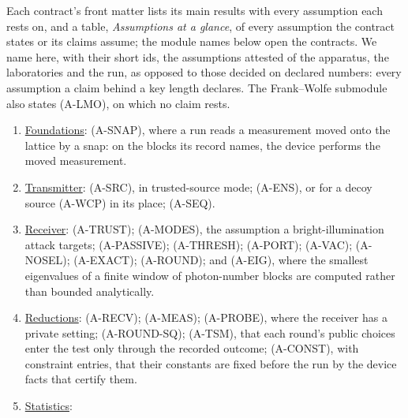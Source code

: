 Each contract's front matter lists its main results with every assumption
each rests on, and a table, \emph{Assumptions at a glance}, of every
assumption the contract states or its claims assume; the module names below
open the contracts. We name here, with their short ids, the assumptions
attested of the apparatus, the laboratories and the run, as opposed to those
decided on declared numbers: every assumption a claim behind a key length
declares. The Frank--Wolfe submodule also states
 (A-LMO), on which no claim rests.
\begin{enumerate}[itemsep=2pt]
\item \href{../modules/foundations/contract.pdf}{Foundations}:
   (A-SNAP), where a run reads a
  measurement moved onto the lattice by a snap: on the blocks its record
  names, the device performs the moved measurement.
\item \href{../modules/transmitter/contract.pdf}{Transmitter}:
   (A-SRC), in trusted-source mode;
   (A-ENS), or for a decoy source
   (A-WCP) in its place;
   (A-SEQ).
\item \href{../modules/receiver/contract.pdf}{Receiver}:
   (A-TRUST);  (A-MODES),
  the assumption a bright-illumination attack targets;
   (A-PASSIVE); 
  (A-THRESH);  (A-PORT); 
  (A-VAC);  (A-NOSEL); 
  (A-EXACT);  (A-ROUND);
  and  (A-EIG), where the smallest eigenvalues of a
  finite window of photon-number blocks are computed rather than bounded
  analytically.
\item \href{../modules/reductions/contract.pdf}{Reductions}:
   (A-RECV);  (A-MEAS);
   (A-PROBE), where the receiver has a private
  setting;  (A-ROUND-SQ);
   (A-TSM), that each round's public choices enter
  the test only through the recorded outcome;
   (A-CONST), with constraint entries, that
  their constants are fixed before the run by the device facts that certify
  them.
\item \href{../modules/statistics/contract.pdf}{Statistics}:

\end{enumerate}
